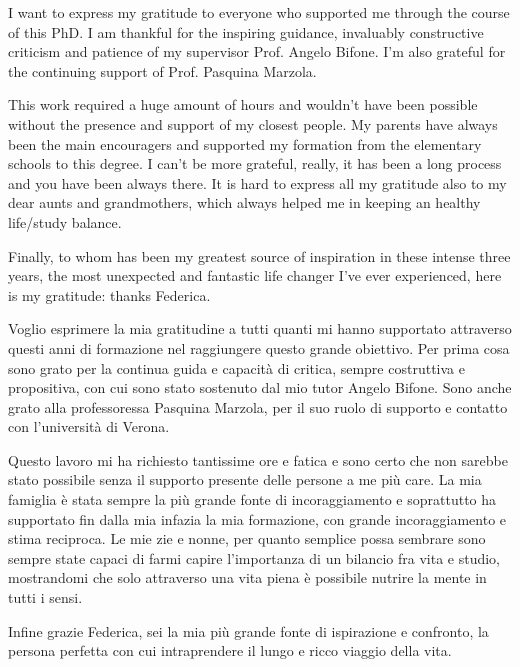 I want to express my gratitude to everyone who supported me through the course of this PhD.
I am thankful for the inspiring guidance, invaluably constructive criticism and patience of my supervisor Prof. Angelo Bifone.
I'm also grateful for the continuing support of Prof. Pasquina Marzola.

This work required a huge amount of hours and wouldn't have been possible without the presence and support of my closest people.
My parents have always been the main encouragers and supported my formation from the elementary schools to this degree.
I can't be more grateful, really, it has been a long process and you have been always there.
It is hard to express all my gratitude also to my dear aunts and grandmothers, which always helped me in keeping an healthy life/study balance.

Finally, to whom has been my greatest source of inspiration in these intense three years, the most unexpected and fantastic life changer I've ever experienced, here is my gratitude: thanks Federica.

\vspace*{\fill}

Voglio esprimere la mia gratitudine a tutti quanti mi hanno supportato attraverso questi anni di formazione nel raggiungere questo grande obiettivo.
Per prima cosa sono grato per la continua guida e capacità di critica, sempre costruttiva e propositiva, con cui sono stato sostenuto dal mio tutor Angelo Bifone.
Sono anche grato alla professoressa Pasquina Marzola, per il suo ruolo di supporto e contatto con l'università di Verona.

Questo lavoro mi ha richiesto tantissime ore e fatica e sono certo che non sarebbe stato possibile senza il supporto presente delle persone a me più care.
La mia famiglia è stata sempre la più grande fonte di incoraggiamento e soprattutto ha supportato fin dalla mia infazia la mia formazione, con grande incoraggiamento e stima reciproca.
Le mie zie e nonne, per quanto semplice possa sembrare sono sempre state capaci di farmi capire l'importanza di un bilancio fra vita e studio, mostrandomi che solo attraverso una vita piena è possibile nutrire la mente in tutti i sensi.

Infine grazie Federica, sei la mia più grande fonte di ispirazione e confronto, la persona perfetta con cui intraprendere il lungo e ricco viaggio della vita.
